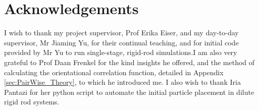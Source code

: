 \documentclass[11pt, a4paper]{article} %
\begin{document}
\section*{Acknowledgements}
I wish to thank my project supervisor, Prof Erika Eiser, and my day-to-day supervisor, Mr Jiaming Yu, for their continual teaching, and for initial code provided by Mr Yu to run single-stage, rigid-rod simulations.I am also very grateful to Prof Daan Frenkel for the kind insights he offered, and the method of calculating the orientational correlation function, detailed in Appendix \ref{sec:PairWise_Theory}, to which he introduced me. I also wish to thank Iria Pantazi for her python script to automate the initial particle placement in dilute rigid rod systems.

\printbibliography
\end{document}
